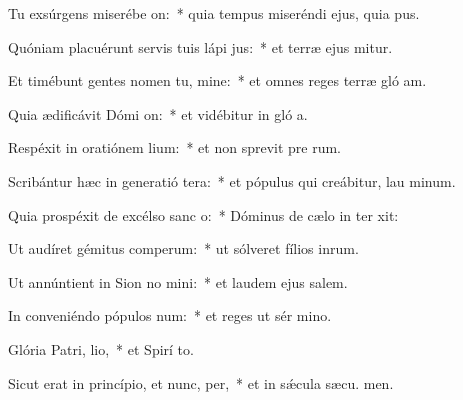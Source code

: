 \item Tu exsúrgens miserébe on:~* quia tempus miseréndi ejus, quia  pus.
\item Quóniam placuérunt servis tuis lápi jus:~* et terræ ejus mitur.
\item Et timébunt gentes nomen tu, mine:~* et omnes reges terræ gló am.
\item Quia ædificávit Dómi on:~* et vidébitur in gló a.
\item Respéxit in oratiónem lium:~* et non sprevit pre rum.
\item Scribántur hæc in generatió tera:~* et pópulus qui creábitur, lau minum.
\item Quia prospéxit de excélso sanc o:~* Dóminus de cælo in ter xit:
\item Ut audíret gémitus comperum:~* ut sólveret fílios inrum.
\item Ut annúntient in Sion no mini:~* et laudem ejus  salem.
\item In conveniéndo pópulos  num:~* et reges ut sér mino.
\item Glória Patri,  lio,~* et Spirí to.
\item Sicut erat in princípio, et nunc,  per,~* et in sǽcula sæcu. men.
